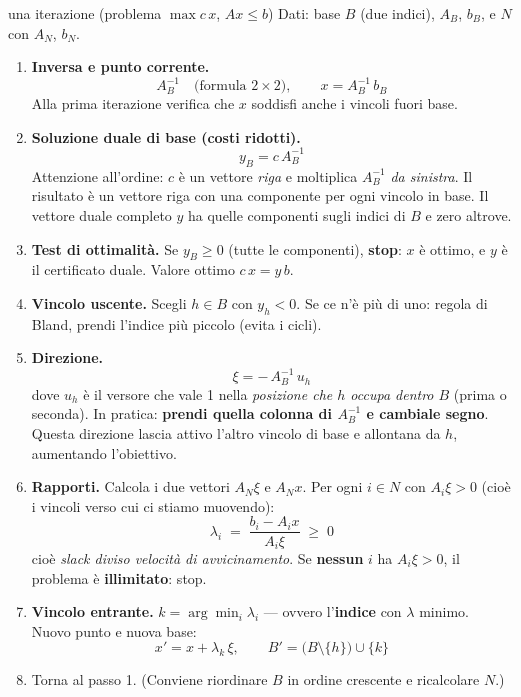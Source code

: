 \documentclass[11pt,a4paper]{article}
\begin{document}
\begin{ric}{una iterazione (problema $\max c\,x$, $Ax \le b$)}
Dati: base $B$ (due indici), $A_B$, $b_B$, e $N$ con $A_N$, $b_N$.

\begin{enumerate}
\item \textbf{Inversa e punto corrente.}
      \[ A_B^{-1} \quad\text{(formula }2\times2\text{)}, \qquad x = A_B^{-1}\, b_B \]
      Alla prima iterazione verifica che $x$ soddisfi anche i vincoli fuori base.

\item \textbf{Soluzione duale di base (costi ridotti).}
      \[ y_B = c\, A_B^{-1} \]
      Attenzione all'ordine: $c$ è un vettore \emph{riga} e moltiplica $A_B^{-1}$ \emph{da sinistra}.
      Il risultato è un vettore riga con una componente per ogni vincolo in base.
      Il vettore duale completo $y$ ha quelle componenti sugli indici di $B$ e zero altrove.

\item \textbf{Test di ottimalità.} Se $y_B \ge 0$ (tutte le componenti), \textbf{stop}:
      $x$ è ottimo, e $y$ è il certificato duale. Valore ottimo $c\,x = y\,b$.

\item \textbf{Vincolo uscente.} Scegli $h \in B$ con $y_h < 0$.
      Se ce n'è più di uno: regola di Bland, prendi l'indice più piccolo (evita i cicli).

\item \textbf{Direzione.}
      \[ \xi = -\,A_B^{-1}\, u_h \]
      dove $u_h$ è il versore che vale 1 nella \emph{posizione che $h$ occupa dentro $B$}
      (prima o seconda). In pratica: \textbf{prendi quella colonna di $A_B^{-1}$ e cambiale segno}.
      Questa direzione lascia attivo l'altro vincolo di base e allontana da $h$, aumentando l'obiettivo.

\item \textbf{Rapporti.} Calcola i due vettori $A_N \xi$ e $A_N x$. Per ogni $i \in N$ con
      $A_i \xi > 0$ (cioè i vincoli verso cui ci stiamo muovendo):
      \[ \lambda_i \;=\; \frac{b_i - A_i x}{A_i \xi} \;\ge\; 0 \]
      cioè \emph{slack diviso velocità di avvicinamento}.
      Se \textbf{nessun} $i$ ha $A_i\xi > 0$, il problema è \textbf{illimitato}: stop.

\item \textbf{Vincolo entrante.} $k = \arg\min_{i} \lambda_i$ --- ovvero l'\textbf{indice} con $\lambda$ minimo.
      Nuovo punto e nuova base:
      \[ x' = x + \lambda_k\, \xi, \qquad B' = \big(B \setminus \{h\}\big) \cup \{k\} \]

\item Torna al passo 1. (Conviene riordinare $B$ in ordine crescente e ricalcolare $N$.)
\end{enumerate}
\end{ric}
\end{document}
